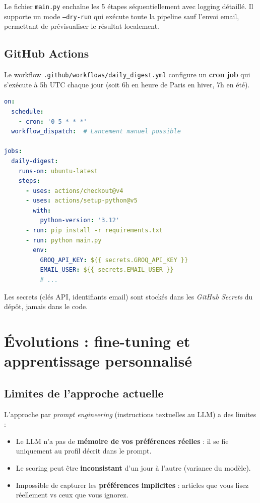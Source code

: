 \documentclass[11pt, a4paper]{article}
\begin{document}
Le fichier \texttt{main.py} enchaîne les 5 étapes séquentiellement avec logging détaillé. Il supporte un mode \texttt{--dry-run} qui exécute toute la pipeline sauf l'envoi email, permettant de prévisualiser le résultat localement.

\subsection{GitHub Actions}

Le workflow \texttt{.github/workflows/daily\_digest.yml} configure un \textbf{cron job} qui s'exécute à 5h UTC chaque jour (soit 6h en heure de Paris en hiver, 7h en été).

\begin{lstlisting}[language=yaml, caption={Extrait du workflow GitHub Actions}]
on:
  schedule:
    - cron: '0 5 * * *'
  workflow_dispatch:  # Lancement manuel possible

jobs:
  daily-digest:
    runs-on: ubuntu-latest
    steps:
      - uses: actions/checkout@v4
      - uses: actions/setup-python@v5
        with:
          python-version: '3.12'
      - run: pip install -r requirements.txt
      - run: python main.py
        env:
          GROQ_API_KEY: ${{ secrets.GROQ_API_KEY }}
          EMAIL_USER: ${{ secrets.EMAIL_USER }}
          # ...
\end{lstlisting}

Les secrets (clés API, identifiants email) sont stockés dans les \textit{GitHub Secrets} du dépôt, jamais dans le code.

\section{Évolutions : fine-tuning et apprentissage personnalisé}

\subsection{Limites de l'approche actuelle}

L'approche par \textit{prompt engineering} (instructions textuelles au LLM) a des limites :

\begin{itemize}
    \item Le LLM n'a pas de \textbf{mémoire de vos préférences réelles} : il se fie uniquement au profil décrit dans le prompt.
    \item Le scoring peut être \textbf{inconsistant} d'un jour à l'autre (variance du modèle).
    \item Impossible de capturer les \textbf{préférences implicites} : articles que vous lisez réellement vs ceux que vous ignorez.
\end{itemize}
\end{document}
